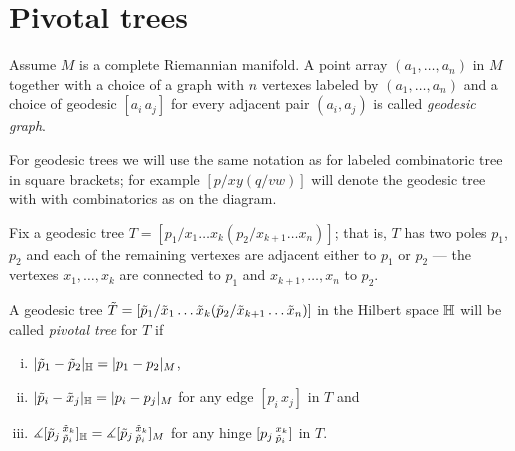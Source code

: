 \section{Pivotal trees}\label{sec:pivotal} 

\begin{wrapfigure}{r}{27 mm}
\vskip-0mm
\end{wrapfigure}

Assume $M$ is a complete Riemannian manifold.
A point array $(a_1,\dots,a_n)$ in $M$ together with a choice of a graph with $n$ vertexes labeled by  $(a_1,\dots,a_n)$ and a choice of geodesic $[a_i\,a_j]$ for every adjacent pair $(a_i,a_j)$ is called \emph{geodesic graph}.

For geodesic trees we will use the same notation as for labeled combinatoric tree in square brackets; for example $[p/xy(q/vw)]$ will denote the geodesic tree with with combinatorics as on the diagram.

Fix a geodesic tree $T=[p_1/x_1\dots x_k(p_2/x_{k+1}\dots x_n)]$;
that is, $T$ has two poles $p_1$, $p_2$ and each of the remaining vertexes are adjacent either to $p_1$ or $p_2$ --- the vertexes $x_1,\dots, x_k$ are connected to $p_1$ and $x_{k+1},\dots, x_n$ to $p_2$.

A geodesic tree  $\~T=[\~p_1/\~x_1\dots \~x_k(\~p_2/\~x_{k+1}\dots \~x_n)]$ in the Hilbert space $\HH$ will be called \emph{pivotal tree} for $T$
if 
\begin{enumerate}[(i)]
\item $|\~p_1-\~p_2|_\HH= |p_1-p_2|_M$,
\item $|\~p_i-\~x_j|_\HH= |p_i-p_j|_M$ for any edge $[p_i\,x_j]$ in $T$ and
\item $\measuredangle[\~p_j\,^{\~x_k}_{\~p_i}]_{\HH}=\measuredangle[\~p_j\,^{\~x_k}_{\~p_i}]_M$
for any hinge  $[p_j\,^{x_k}_{\~p_i}]$ in $T$.
\end{enumerate}


